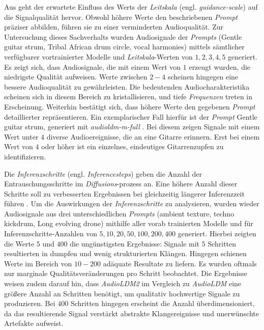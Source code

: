 \documentclass[
  a4paper,  %
  twoside,  %
  bibliography=totoc,
  headsepline,
  cleardoublepage=empty,
  parskip=half,
  draft=false
]{scrbook}
\begin{document}
{Aus \cite{noauthor_huggingface-audioldm_nodate, noauthor_huggingface-audioldm2_nodate} geht der erwartete Einfluss des Werts der \emph{Leitskala} (engl. \emph{guidance-scale}) auf die Signalqualität hervor. Obwohl höhere Werte den beschriebenen \emph{Prompt} präziser abbilden, führen sie zu einer verminderten Audioqualität. Zur Untersuchung dieses Sachverhalts wurden Audiosignale der \emph{Prompts} (\glqq Gentle guitar strum, Tribal African drum circle, vocal harmonies\grqq) mittels sämtlicher verfügbarer vortrainierter Modelle und \emph{Leitskala}-Werten von $1,2,3,4,5$ generiert. Es zeigt sich, dass Audiosignale, die mit einem Wert von $1$ erzeugt wurden, die niedrigste Qualität aufweisen. Werte zwischen $2-4$ scheinen hingegen eine bessere Audioqualität zu gewährleisten. Die bedeutenden Audiocharakteristika scheinen sich in diesem Bereich zu kristallisieren, und tiefe \emph{Frequenzen} treten in Erscheinung. Weiterhin bestätigt sich, dass höhere Werte den gegebenen \emph{Prompt} detaillierter repräsentieren. Ein exemplarischer Fall hierfür ist der \emph{Prompt} \glqq Gentle guitar strum\grqq, generiert mit \emph{audioldm-m-full} \cite{noauthor_cvsspaudioldm-m-full_nodate}. Bei diesem zeigen Signale mit einem Wert unter $4$ diverse Audioereignisse, die an eine Gitarre erinnern. Erst bei einem Wert von $4$ oder höher ist ein einzelnes, eindeutiges Gitarrenzupfen zu identifizieren.

Die \emph{Inferenzschritte} (engl. \emph{Inferencesteps}) geben die Anzahl der Entrauschungsschritte im \emph{Diffusions}-prozess an. Eine höhere Anzahl dieser Schritte soll zu verbesserten Ergebnissen bei gleichzeitig längerer Inferenzzeit führen \cite{noauthor_huggingface-audioldm2_nodate, noauthor_huggingface-audioldm_nodate}. Um die Auswirkungen der \emph{Inferenzschritte} zu analysieren, wurden wieder Audiosignale aus drei unterschiedlichen \emph{Prompts} (\glqq ambient texture\grqq, \glqq techno kickdrum\grqq, \glqq Long evolving drone\grqq) mithilfe aller vorab trainierten Modelle und für Inferenzschritte-Anzahlen von $5,10,20,50,100,200,400$ generiert. Hierbei zeigten die Werte $5$ und $400$ die ungünstigsten Ergebnisse: Signale mit $5$ Schritten resultierten in dumpfen und wenig strukturierten Klängen. Hingegen schienen Werte im Bereich von $10-200$ adäquate Resultate zu liefern. Es wurden oftmals nur marginale Qualitätsveränderungen pro Schritt beobachtet. Die Ergebnisse weisen zudem darauf hin, dass \emph{AudioLDM2} im Vergleich zu \emph{AudioLDM} eine größere Anzahl an Schritten benötigt, um qualitativ hochwertige Signale zu produzieren. Bei $400$ Schritten hingegen erscheint die Anzahl überdimensioniert, da das resultierende Signal verstärkt abstrakte Klangereignisse und unerwünschte Artefakte aufweist.

}
\end{document}
